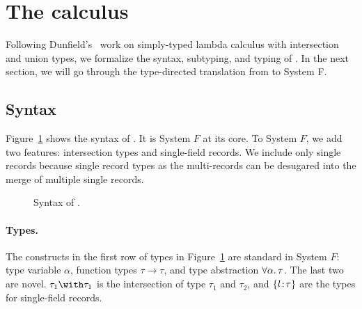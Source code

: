 \section{The \name calculus}



Following Dunfield's~\cite{dunfield2014elaborating} work on simply-typed lambda
calculus with intersection and union types, we formalize the syntax, subtyping,
and typing of \name. In the next section, we will go through the type-directed
translation from \name to System F.



\subsection{Syntax}

Figure~\ref{fig:fi-syntax} shows the syntax of \name. It is System $ F $ at its
core. To System $ F $, we add two features: intersection types and single-field
records.
We include only single records because single record types as the multi-records
can be desugared into the merge of multiple single records.

\begin{figure}[h]
  
  \caption{Syntax of \name.}
  \label{fig:fi-syntax}
\end{figure}

\paragraph{Types.} The constructs in the first row of types in
Figure~\ref{fig:fi-syntax} are standard in System $ F $: type variable
$ \alpha $, function types $ \tau \to \tau $, and type abstraction
$ \forall \alpha. \, \tau $. The last two are novel. $ \tau_1 \andop \tau_1 $ is
the intersection of type $ \tau_1 $ and $ \tau_2 $, 
and $ \{ l \!:\! \tau \} $ are the types for single-field records.

